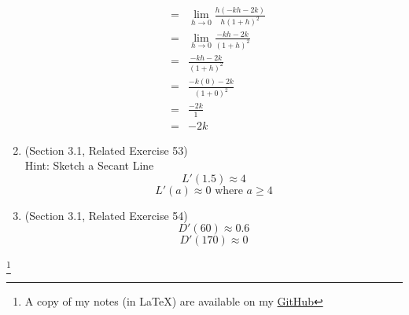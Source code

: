 \documentclass{article}
\newcommand\blfootnote[1]{
    \begingroup
    \renewcommand\thefootnote{}\footnote{#1}
    \addtocounter{footnote}{-1}
    \endgroup
}
\begin{document}
\begin{enumerate}
\begin{eqnarray}
                                                &=& \lim_{h \to 0}{\frac{h(- kh - 2k)}{h(1 + h)^2}} \\
                                                &=& \lim_{h \to 0}{\frac{- kh - 2k}{(1 + h)^2}} \\
                                                &=& \frac{- kh - 2k}{(1 + h)^2} \\
                                                &=& \frac{- k(0) - 2k}{(1 + 0)^2} \\
                                                &=& \frac{- 2k}{1} \\
                                                &=& - 2k
    \end{eqnarray}
    \item (Section 3.1, Related Exercise 53)
        \\ Hint: Sketch a Secant Line
        $$L'(1.5) \approx 4$$
        $$L'(a) \approx 0 \text{ where } a \geq 4$$
    \item (Section 3.1, Related Exercise 54)
        $$D'(60) \approx 0.6$$
        $$D'(170) \approx 0$$
\end{enumerate}

\blfootnote{A copy of my notes (in \LaTeX) are available on my \href{https://github.com/onlinechronically/MATH-211}{GitHub}}
\end{document}

